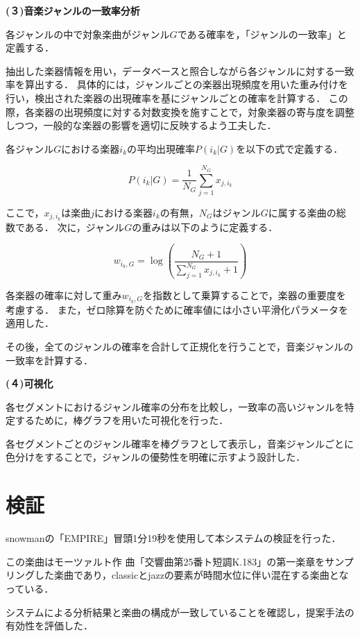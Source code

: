 \textbf{(３)音楽ジャンルの一致率分析}

各ジャンルの中で対象楽曲がジャンル$G$である確率を，「ジャンルの一致率」と定義する．

抽出した楽器情報を用い，データベースと照合しながら各ジャンルに対する一致率を算出する．
具体的には，ジャンルごとの楽器出現頻度を用いた重み付けを行い，検出された楽器の出現確率を基にジャンルごとの確率を計算する．
この際，各楽器の出現頻度に対する対数変換を施すことで，対象楽器の寄与度を調整しつつ，一般的な楽器の影響を適切に反映するよう工夫した．

各ジャンル$G$における楽器$i_k$の平均出現確率$P(i_k|G)$を以下の式で定義する．

\begin{equation}
	P(i_k | G) = \frac{1}{N_G} \sum_{j=1}^{N_G} x_{j, i_k}
\end{equation}

ここで，$x_{j, i_k}$は楽曲$j$における楽器$i_k$の有無，$N_G$はジャンル$G$に属する楽曲の総数である．
次に，ジャンル$G$の重みは以下のように定義する．

\begin{equation}
	w_{i_k, G} = \log \left( \frac{N_G + 1}{\sum_{j=1}^{N_G} x_{j, i_k} + 1} \right)
\end{equation}

各楽器の確率に対して重み$w_{i_k, G}$を指数として乗算することで，楽器の重要度を考慮する．
また，ゼロ除算を防ぐために確率値には小さい平滑化パラメータを適用した．

その後，全てのジャンルの確率を合計して正規化を行うことで，音楽ジャンルの一致率を計算する．

\textbf{(４)可視化}

各セグメントにおけるジャンル確率の分布を比較し，一致率の高いジャンルを特定するために，棒グラフを用いた可視化を行った．

各セグメントごとのジャンル確率を棒グラフとして表示し，音楽ジャンルごとに色分けをすることで，ジャンルの優勢性を明確に示すよう設計した．


\section{検証}
snowmanの「EMPIRE」冒頭1分19秒を使用して本システムの検証を行った．

この楽曲はモーツァルト作
曲「交響曲第25番ト短調K.183」の第一楽章をサンプリングした楽曲であり，classicとjazzの要素が時間水位に伴い混在する楽曲となっている．

システムによる分析結果と楽曲の構成が一致していることを確認し，提案手法の有効性を評価した．

